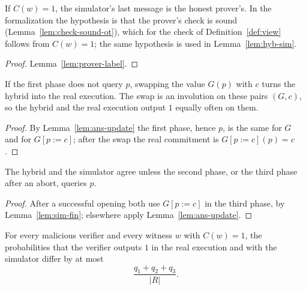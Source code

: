 \begin{lemma}
  \label{lem:sim-fin}
  \leanok
  If $C(w) = 1$, the simulator's last message is the honest prover's. In the formalization the
  hypothesis is that the prover's check is sound (Lemma~\ref{lem:check-sound-ot}), which for the
  check of Definition~\ref{def:view} follows from $C(w) = 1$; the same hypothesis is used in
  Lemma~\ref{lem:hyb-sim}.
\end{lemma}

\begin{proof}
  \leanok
  Lemma~\ref{lem:prover-label}.
\end{proof}

\begin{lemma}
  \label{lem:hyb-real}
  \leanok
  If the first phase does not query $p$, swapping the value $G(p)$ with $c$ turns the hybrid into
  the real execution. The swap is an involution on these pairs $(G, c)$, so the hybrid and the real
  execution output $1$ equally often on them.
\end{lemma}

\begin{proof}
  \leanok
  By Lemma~\ref{lem:ans-update} the first phase, hence $p$, is the same for $G$ and for $G[p := c]$;
  after the swap the real commitment is $G[p := c](p) = c$.
\end{proof}

\begin{lemma}
  \label{lem:hyb-sim}
  \leanok
  The hybrid and the simulator agree unless the second phase, or the third phase after an abort,
  queries $p$.
\end{lemma}

\begin{proof}
  \leanok
  After a successful opening both use $G[p := c]$ in the third phase, by Lemma~\ref{lem:sim-fin};
  elsewhere apply Lemma~\ref{lem:ans-update}.
\end{proof}

\begin{theorem}
  \label{thm:zk-rom}
  \leanok
  For every malicious verifier and every witness $w$ with $C(w) = 1$, the probabilities that the
  verifier outputs $1$ in the real execution and with the simulator differ by at most
  \[ \frac{q_1 + q_2 + q_3}{|R|} . \]
\end{theorem}

